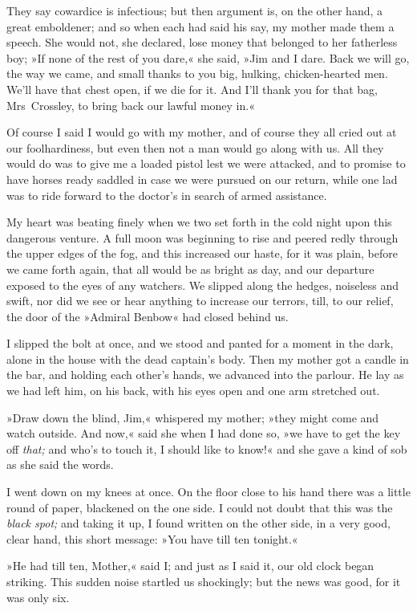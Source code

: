 They say cowardice is infectious; but then argument is, on the other hand, a great emboldener; and so when each had said his say, my mother made them a speech. She would not, she declared, lose money that belonged to her fatherless boy; »If none of the rest of you dare,« she said, »Jim and I dare. Back we will go, the way we came, and small thanks to you big, hulking, chicken-hearted men. We'll have that chest open, if we die for it. And I'll thank you for that bag, Mrs~Crossley, to bring back our lawful money in.«

Of course I said I would go with my mother, and of course they all cried out at our foolhardiness, but even then not a man would go along with us. All they would do was to give me a loaded pistol lest we were attacked, and to promise to have horses ready saddled in case we were pursued on our return, while one lad was to ride forward to the doctor's in search of armed assistance.

My heart was beating finely when we two set forth in the cold night upon this dangerous venture. A full moon was beginning to rise and peered redly through the upper edges of the fog, and this increased our haste, for it was plain, before we came forth again, that all would be as bright as day, and our departure exposed to the eyes of any watchers. We slipped along the hedges, noiseless and swift, nor did we see or hear anything to increase our terrors, till, to our relief, the door of the »Admiral Benbow« had closed behind us.

I slipped the bolt at once, and we stood and panted for a moment in the dark, alone in the house with the dead captain's body. Then my mother got a candle in the bar, and holding each other's hands, we advanced into the parlour. He lay as we had left him, on his back, with his eyes open and one arm stretched out.

»Draw down the blind, Jim,« whispered my mother; »they might come and watch outside. And now,« said she when I had done so, »we have to get the key off \textit{that;} and who's to touch it, I should like to know!« and she gave a kind of sob as she said the words.

I went down on my knees at once. On the floor close to his hand there was a little round of paper, blackened on the one side. I could not doubt that this was the \textit{black spot;} and taking it up, I found written on the other side, in a very good, clear hand, this short message: »You have till ten tonight.«

»He had till ten, Mother,« said I; and just as I said it, our old clock began striking. This sudden noise startled us shockingly; but the news was good, for it was only six.

